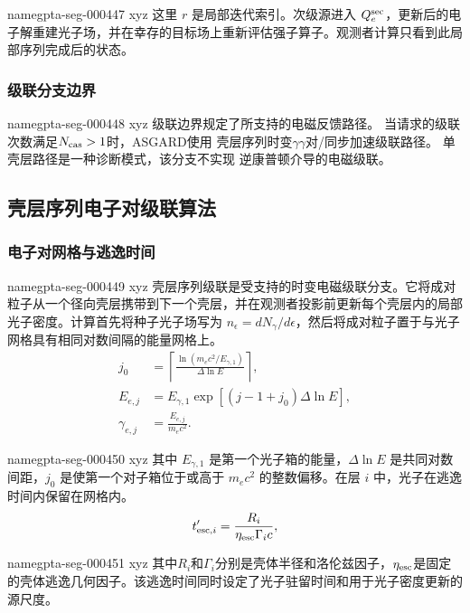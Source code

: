 \documentclass[twocolumn]{aastex702}
\makeatletter
\providecommand{\gptareaderanchor}[1]{\pdfdest name{#1} xyz}%
\providecommand{\gptareaderanchor}[1]{\special{pdf:dest (#1) [ @thispage /XYZ @xpos @ypos null ]}}%
\makeatother
\begin{document}
\gptareaderanchor{gpta-seg-000447}%
这里 \(r\) 是局部迭代索引。次级源进入 \(Q_e^{\rm sec}\)，更新后的电子解重建光子场，并在幸存的目标场上重新评估强子算子。观测者计算只看到此局部序列完成后的状态。

\subsubsection{级联分支边界}


\gptareaderanchor{gpta-seg-000448}%
级联边界规定了所支持的电磁反馈路径。
当请求的级联次数满足\(N_{\rm cas}>1\)时，ASGARD使用
壳层序列时变\(\gamma\gamma\)对/同步加速级联路径。
单壳层路径是一种诊断模式，该分支不实现
逆康普顿介导的电磁级联。

\subsection{壳层序列电子对级联算法}

\subsubsection{电子对网格与逃逸时间}


\gptareaderanchor{gpta-seg-000449}%
壳层序列级联是受支持的时变电磁级联分支。它将成对粒子从一个径向壳层携带到下一个壳层，并在观测者投影前更新每个壳层内的局部光子密度。计算首先将种子光子场写为 \(n_\epsilon=dN_\gamma/d\epsilon\)，然后将成对粒子置于与光子网格具有相同对数间隔的能量网格上。
\begin{equation}
\begin{aligned}
j_0&=\left\lceil
\frac{\ln(m_ec^2/E_{\gamma,1})}{\Delta\ln E}
\right\rceil,\\
E_{e,j}&=E_{\gamma,1}\exp[(j-1+j_0)\Delta\ln E],\\
\gamma_{e,j}&=\frac{E_{e,j}}{m_ec^2}.
\end{aligned}
\end{equation}

\gptareaderanchor{gpta-seg-000450}%
其中 \(E_{\gamma,1}\) 是第一个光子箱的能量，\(\Delta\ln E\) 是共同对数间距，\(j_0\) 是使第一个对子箱位于或高于 \(m_ec^2\) 的整数偏移。在层 \(i\) 中，光子在逃逸时间内保留在网格内。
\begin{equation}
t'_{{\rm esc},i}=\frac{R_i}{\eta_{\rm esc}\Gamma_i c},
\end{equation}

\gptareaderanchor{gpta-seg-000451}%
其中\(R_i\)和\(\Gamma_i\)分别是壳体半径和洛伦兹因子，\(\eta_{\rm esc}\)是固定的壳体逃逸几何因子。该逃逸时间同时设定了光子驻留时间和用于光子密度更新的源尺度。
\end{document}
